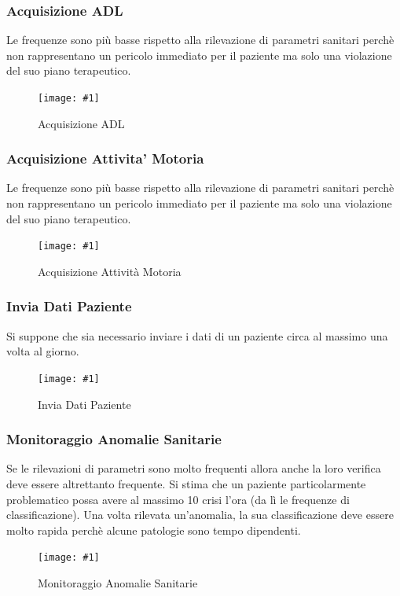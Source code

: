 \documentclass[a4paper,11pt,oneside, table]{article}
\newcommand{\putimage}[4] {
	\begin{figure}[H]
	    \centering
	    \texttt{[image: \#1]}
	    \caption{#2}\label{#3}
	\end{figure}
}
\begin{document}
\subsubsection{Acquisizione ADL}

Le frequenze sono pi\`u basse rispetto alla rilevazione di parametri sanitari perch\`e non rappresentano un pericolo immediato per il paziente ma solo una violazione del suo piano terapeutico.

\putimage{images/Diagramma delle Attivita'/Acquisizione ADL.png}{Acquisizione ADL}{png:act:acquisizione-adl}{1}

\subsubsection{Acquisizione Attivita' Motoria}

Le frequenze sono pi\`u basse rispetto alla rilevazione di parametri sanitari perch\`e non rappresentano un pericolo immediato per il paziente ma solo una violazione del suo piano terapeutico.

\putimage{images/Diagramma delle Attivita'/Acquisizione Attivita' Motoria.png}{Acquisizione Attivit\`a Motoria}{png:act:acquisizione-attivita-motoria}{1}

\subsubsection{Invia Dati Paziente}

Si suppone che sia necessario inviare i dati di un paziente circa al massimo una volta al giorno.

\putimage{images/Diagramma delle Attivita'/Invia Dati Paziente.png}{Invia Dati Paziente}{png:act:invia-dati-paziente}{1}

\subsubsection{Monitoraggio Anomalie Sanitarie}

Se le rilevazioni di parametri sono molto frequenti allora anche la loro verifica deve essere altrettanto frequente.
Si stima che un paziente particolarmente problematico possa avere al massimo 10 crisi l'ora (da l\`i le frequenze di classificazione).
Una volta rilevata un'anomalia, la sua classificazione deve essere molto rapida perch\`e alcune patologie sono tempo dipendenti.

\putimage{images/Diagramma delle Attivita'/Monitoraggio Anomalie Sanitarie.png}{Monitoraggio Anomalie Sanitarie}{png:act:monitoraggio-anomalie-sanitarie}{1}
\end{document}
